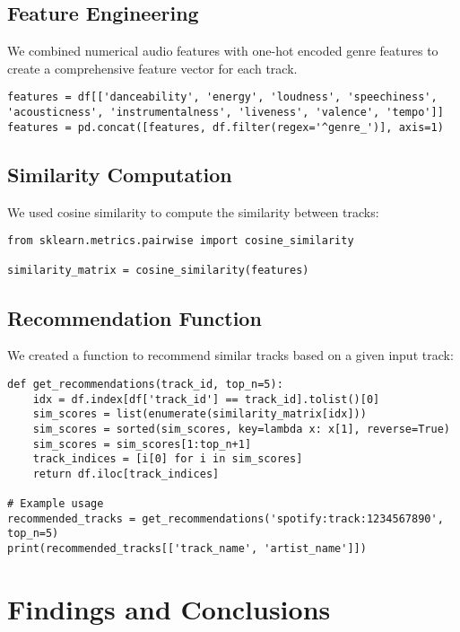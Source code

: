 \documentclass[runningheads]{llncs}
\begin{document}
\subsection{Feature Engineering}

We combined numerical audio features with one-hot encoded genre features to create a comprehensive feature vector for each track.

\begin{verbatim}
features = df[['danceability', 'energy', 'loudness', 'speechiness', 'acousticness', 'instrumentalness', 'liveness', 'valence', 'tempo']]
features = pd.concat([features, df.filter(regex='^genre_')], axis=1)
\end{verbatim}

\subsection{Similarity Computation}

We used cosine similarity to compute the similarity between tracks:

\begin{verbatim}
from sklearn.metrics.pairwise import cosine_similarity

similarity_matrix = cosine_similarity(features)
\end{verbatim}

\subsection{Recommendation Function}

We created a function to recommend similar tracks based on a given input track:

\begin{verbatim}
def get_recommendations(track_id, top_n=5):
    idx = df.index[df['track_id'] == track_id].tolist()[0]
    sim_scores = list(enumerate(similarity_matrix[idx]))
    sim_scores = sorted(sim_scores, key=lambda x: x[1], reverse=True)
    sim_scores = sim_scores[1:top_n+1]
    track_indices = [i[0] for i in sim_scores]
    return df.iloc[track_indices]

# Example usage
recommended_tracks = get_recommendations('spotify:track:1234567890', top_n=5)
print(recommended_tracks[['track_name', 'artist_name']])
\end{verbatim}

\section{Findings and Conclusions}
\end{document}
